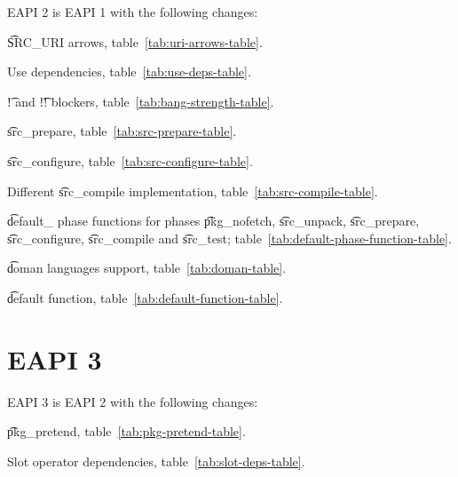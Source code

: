 EAPI 2 is EAPI 1 with the following changes:

\begin{compactitem}
\item \t{SRC\_URI} arrows, table~\ref{tab:uri-arrows-table}.
\item Use dependencies, table~\ref{tab:use-deps-table}.
\item \t{!} and \t{!!} blockers, table~\ref{tab:bang-strength-table}.
\item \t{src\_prepare}, table~\ref{tab:src-prepare-table}.
\item \t{src\_configure}, table~\ref{tab:src-configure-table}.
\item Different \t{src\_compile} implementation, table~\ref{tab:src-compile-table}.
\item \t{default\_} phase functions for phases \t{pkg\_nofetch}, \t{src\_unpack}, \t{src\_prepare},
    \t{src\_configure}, \t{src\_compile} and \t{src\_test}; table~\ref{tab:default-phase-function-table}.
\item \t{doman} languages support, table~\ref{tab:doman-table}.
\item \t{default} function, table~\ref{tab:default-function-table}.
\end{compactitem}

\section*{EAPI 3}

EAPI 3 is EAPI 2 with the following changes:

\begin{compactitem}
\item \t{pkg\_pretend}, table~\ref{tab:pkg-pretend-table}.
\item Slot operator dependencies, table~\ref{tab:slot-deps-table}.
\end{compactitem}


